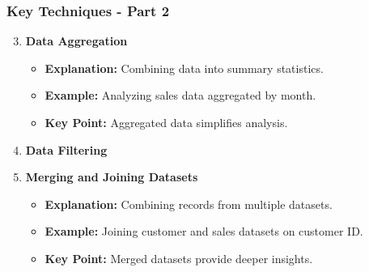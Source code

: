 \documentclass[aspectratio=169]{beamer}
\begin{document}
\begin{frame}[fragile]
    \frametitle{Key Techniques - Part 2}

    \begin{enumerate}
        \setcounter{enumi}{2} %
        \item \textbf{Data Aggregation}
        \begin{itemize}
            \item \textbf{Explanation:} Combining data into summary statistics.
            \item \textbf{Example:} Analyzing sales data aggregated by month.
            \item \textbf{Key Point:} Aggregated data simplifies analysis.
        \end{itemize}

        \item \textbf{Data Filtering}
        
        \item \textbf{Merging and Joining Datasets}
        \begin{itemize}
            \item \textbf{Explanation:} Combining records from multiple datasets.
            \item \textbf{Example:} Joining customer and sales datasets on customer ID.
            \item \textbf{Key Point:} Merged datasets provide deeper insights.
        \end{itemize}
    \end{enumerate}
\end{frame}
\end{document}
